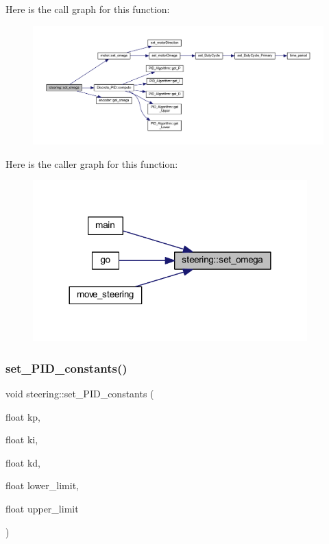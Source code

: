 Here is the call graph for this function\+:
\nopagebreak
\begin{figure}[H]
\begin{center}
\leavevmode
\includegraphics[width=350pt]{classsteering_a3f041a24795b6f4f886f46ca23dbc3e6_cgraph}
\end{center}
\end{figure}
Here is the caller graph for this function\+:
\nopagebreak
\begin{figure}[H]
\begin{center}
\leavevmode
\includegraphics[width=300pt]{classsteering_a3f041a24795b6f4f886f46ca23dbc3e6_icgraph}
\end{center}
\end{figure}
\mbox{\label{classsteering_a6fb4cfdc9378336f78832351c4f6d181}} 
\subsubsection{\texorpdfstring{set\_PID\_constants()}{set\_PID\_constants()}}
{\footnotesize\ttfamily void steering\+::set\+\_\+\+P\+I\+D\+\_\+constants (\begin{DoxyParamCaption}\item[{float}]{kp,  }\item[{float}]{ki,  }\item[{float}]{kd,  }\item[{float}]{lower\+\_\+limit,  }\item[{float}]{upper\+\_\+limit }\end{DoxyParamCaption})\hspace{0.3cm}{\ttfamily [inline]}}



